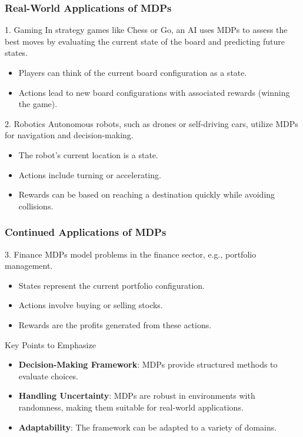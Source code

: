 \documentclass{beamer}
\begin{document}
\begin{frame}[fragile]
    \frametitle{Real-World Applications of MDPs}
    \begin{block}{1. Gaming}
        In strategy games like Chess or Go, an AI uses MDPs to assess the best moves by evaluating the current state of the board and predicting future states.
        \begin{itemize}
            \item Players can think of the current board configuration as a state.
            \item Actions lead to new board configurations with associated rewards (winning the game).
        \end{itemize}
    \end{block}

    \begin{block}{2. Robotics}
        Autonomous robots, such as drones or self-driving cars, utilize MDPs for navigation and decision-making.
        \begin{itemize}
            \item The robot’s current location is a state.
            \item Actions include turning or accelerating. 
            \item Rewards can be based on reaching a destination quickly while avoiding collisions.
        \end{itemize}
    \end{block}
\end{frame}

\begin{frame}[fragile]
    \frametitle{Continued Applications of MDPs}
    \begin{block}{3. Finance}
        MDPs model problems in the finance sector, e.g., portfolio management.
        \begin{itemize}
            \item States represent the current portfolio configuration.
            \item Actions involve buying or selling stocks.
            \item Rewards are the profits generated from these actions.
        \end{itemize}
    \end{block}

    \begin{block}{Key Points to Emphasize}
        \begin{itemize}
            \item \textbf{Decision-Making Framework}: MDPs provide structured methods to evaluate choices.
            \item \textbf{Handling Uncertainty}: MDPs are robust in environments with randomness, making them suitable for real-world applications.
            \item \textbf{Adaptability}: The framework can be adapted to a variety of domains.
        \end{itemize}
    \end{block}
\end{frame}
\end{document}
